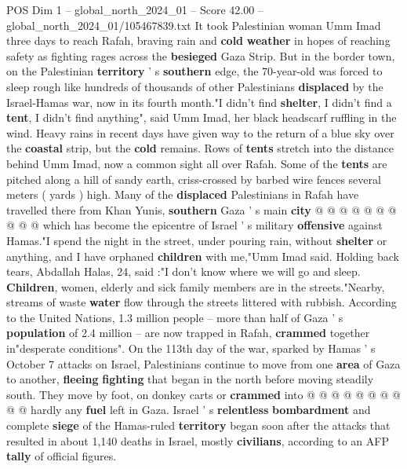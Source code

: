 \begin{textsample}{POS Dim 1 – global\_north\_2024\_01 – Score 42.00 – global\_north\_2024\_01/105467839.txt}  \label{ex:f1_pos_159}
It took Palestinian woman Umm Imad three days to reach Rafah, braving rain and \textbf{cold} \textbf{weather} in hopes of reaching safety as fighting rages across the \textbf{besieged} Gaza Strip.
But in the border town, on the Palestinian \textbf{territory} ' s \textbf{southern} edge, the 70-year-old was forced to sleep rough like hundreds of thousands of other Palestinians \textbf{displaced} by the Israel-Hamas war, now in its fourth month."I didn't find \textbf{shelter}, I didn't find a \textbf{tent}, I didn't find anything", said Umm Imad, her black headscarf ruffling in the wind.
Heavy rains in recent days have given way to the return of a blue sky over the \textbf{coastal} strip, but the \textbf{cold} remains.
Rows of \textbf{tents} stretch into the distance behind Umm Imad, now a common sight all over Rafah.
Some of the \textbf{tents} are pitched along a hill of sandy earth, criss-crossed by barbed wire fences several meters ( yards ) high.
Many of the \textbf{displaced} Palestinians in Rafah have travelled there from Khan Yunis, \textbf{southern} Gaza ' s main \textbf{city} @ @ @ @ @ @ @ @ @ @ which has become the epicentre of Israel ' s military \textbf{offensive} against Hamas."I spend the night in the street, under pouring rain, without \textbf{shelter} or anything, and I have orphaned \textbf{children} with me,"Umm Imad said.
Holding back tears, Abdallah Halas, 24, said :"I don't know where we will go and sleep. \textbf{Children}, women, elderly and sick family members are in the streets."Nearby, streams of waste \textbf{water} flow through the streets littered with rubbish.
According to the United Nations, 1.3 million people -- more than half of Gaza ' s \textbf{population} of 2.4 million -- are now trapped in Rafah, \textbf{crammed} together in"desperate conditions".
On the 113th day of the war, sparked by Hamas ' s October 7 attacks on Israel, Palestinians continue to move from one \textbf{area} of Gaza to another, \textbf{fleeing} \textbf{fighting} that began in the north before moving steadily south.
They move by foot, on donkey carts or \textbf{crammed} into @ @ @ @ @ @ @ @ @ @ hardly any \textbf{fuel} left in Gaza.
Israel ' s \textbf{relentless} \textbf{bombardment} and complete \textbf{siege} of the Hamas-ruled \textbf{territory} began soon after the attacks that resulted in about 1,140 deaths in Israel, mostly \textbf{civilians}, according to an AFP \textbf{tally} of official figures.

\end{textsample}
